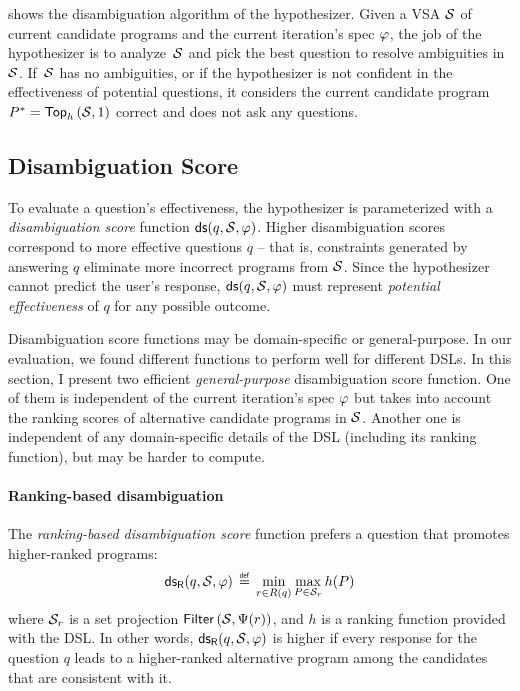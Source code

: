  shows the disambiguation algorithm of the hypothesizer.
Given a VSA $\mathcal{S}$ of current candidate programs and the current iteration's spec $\varphi$, the job of the hypothesizer
is to analyze~$\mathcal{S}$ and pick the best question to resolve ambiguities in~$\mathcal{S}$.
If~$\mathcal{S}$ has no ambiguities, or if the hypothesizer is not confident in the effectiveness of potential questions, it
considers the current candidate program $P^{*} = \mathsf{Top}_h \left(\mathcal{S}, 1\right)$ correct and does not ask any
questions.

\subsection{Disambiguation Score}

To evaluate a question's effectiveness, the hypothesizer is parameterized with a \emph{disambiguation score} function
$\mathsf{ds}(q, \mathcal{S}, \varphi)$.
Higher disambiguation scores correspond to more effective questions $q$ -- that is, constraints generated by answering
$q$ eliminate more incorrect programs from $\mathcal{S}$.
Since the hypothesizer cannot predict the user's response, $\mathsf{ds}(q, \mathcal{S}, \varphi)$ must represent \emph{potential
effectiveness} of $q$ for any possible outcome.

Disambiguation score functions may be domain-specific or general-purpose.
In our evaluation, we found different functions to perform well for different DSLs.
In this section, I present two efficient \emph{general-purpose} disambiguation score function.
One of them is independent of the current iteration's spec $\varphi$ but takes into account the ranking scores of
alternative candidate programs in $\mathcal{S}$.
Another one is independent of any domain-specific details of the DSL (including its ranking function), but may be harder
to compute.

\paragraph{Ranking-based disambiguation}
The \emph{ranking-based disambiguation score} function prefers a question that promotes higher-ranked programs:
\[
    \mathsf{ds_R}(q , \mathcal{S}, \varphi) \,\mathrel{\overset{\mathsf{\scriptscriptstyle def}}{=}}\, \min_{r \in R(q)} \max_{P \in \mathcal{S}_r} h(P)
\]
where $\mathcal{S}_r$ is a set projection $\mathsf{Filter}\left(\mathcal{S}, \Psi(r)\right)$, and $h$ is a ranking function provided
with the DSL.
In other words, $\mathsf{ds_R}(q , \mathcal{S}, \varphi)$ is higher if every response for the question $q$ leads to a
higher-ranked alternative program among the candidates that are consistent with it.

